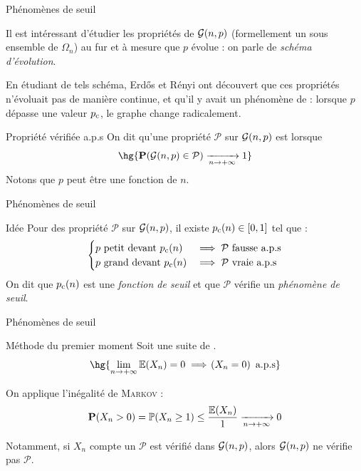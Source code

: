 \documentclass[french,bookmarks]{beamer}
\makeatletter
\newcommand{\bdE}{\mathbb{E}}
\newcommand{\bdN}{\mathbb{N}}
\newcommand{\bdP}{\mathbb{P}}
\newcommand{\bcG}{\mathcal{G}}
\newcommand{\bcP}{\mathcal{P}}
\newcommand{\bbP}{\mathbf{P}}
\renewenvironment{proof}[1][Preuve]{%
    \par\pushQED{\color{black}\qed}\normalfont%
    \topsep6\p@\@plus6\p@\relax
    \trivlist\item[\hskip\labelsep\colorbox{\nproofcolor!85!gray!20}{\color{\nproofcolor}\rmfamily\itshape#1\@addpunct{.}}]%
    \ignorespaces\rmfamily\small
}{%
  \popQED\endtrivlist\@endpefalse
}
\newenvironment{nproof}{
    \begingroup
    \begin{tcolorbox}[
        breakable,
        enhanced,
        interior style      = {
            left color      = main1white2!65!gray!8,
            middle color    = main1white2!50!gray!7,
            right color     = main1white2!35!gray!6
        },
        borderline west     = {2pt}{0pt}{\nproofcolor!85!gray!50},
        sharp corners       = downhill,
        frame hidden,
        arc                 = 0 cm,
        boxrule             = 0 cm,
        nobeforeSTYLE,
        noafterSTYLE,
    ]
        \begin{proof}\sffamily
}{
        \end{proof}
    \end{tcolorbox}
    \endgroup
}
\makeatother
\begin{document}
\begin{frame}{Phénomènes de seuil}

    \begin{enumerate}
        \itt Il est intéressant d'étudier les propriétés de $\bcG\p{n, p}$ (formellement un sous ensemble de $\Omega_n$) au fur et à mesure que $p$ évolue : on parle de \emph{schéma d'évolution}.\pause
        
        \itt En étudiant de tels schéma, Erdős et Rényi ont découvert que ces propriétés n'évoluait pas de manière continue, et qu'il y avait un phénomène de  : lorsque $p$ dépasse une valeur $p_\text c$, le graphe change radicalement.
    \end{enumerate}
    \pause
    
    \begin{bdefinition}{Propriété vérifiée a.p.s}{}
        On dit qu'une propriété $\bcP$ sur $\bcG\p{n, p}$ est  lorsque
        \[ \hg{\bbP\p{\bcG\p{n, p} \in \bcP} \lima{n \to +\infty} 1}\]
        Notons que $p$ peut être une fonction de $n$.
    \end{bdefinition}
\end{frame}

\begin{frame}{Phénomènes de seuil}
    \begin{bform}{Idée}{}
            Pour des propriété $\bcP$ sur $\bcG\p{n, p}$, il existe $p_\text c\!\left(n\right) \in \left[0, 1\right]$ tel que :
            \[ \begin{cases}
                p \ \text{petit devant} \ p_\text c\p{n} &\implies \bcP \ \text{fausse a.p.s}\\
                p \ \text{grand devant} \ p_\text c\p{n} &\implies \bcP \ \text{vraie a.p.s}
            \end{cases}\]
            \pause
            On dit que $p_\text c\!\left(n\right)$ est une \emph{fonction de seuil} et que $\bcP$ vérifie un \emph{phénomène de seuil}.
    \end{bform}
\end{frame}

\begin{frame}{Phénomènes de seuil}
    \begin{bproperty}{Méthode du premier moment}{}
        Soit \hg{$\p{X_n}_{n \in \bdN^*}$} une suite de \hg{v.a. à valeurs dans $\bdN$}.
        \[ \hg{\lim\limits_{n \to +\infty} \bdE\p{X_n} = 0 \implies \p{X_n = 0} \ \text{a.p.s}} \]
    \end{bproperty}
    \pause
    \begin{nproof}
        On applique l'inégalité de \textsc{Markov} :
        \[ \bbP\p{X_n > 0} = \bdP\p{X_n \geq 1} \leq \dfrac{\bdE\p{X_n}}{1} \lima{n \to +\infty} 0\]
    \end{nproof}\pause
    
    Notamment, si $X_n$ compte  un $\bcP$ est vérifié dans $\bcG\p{n, p}$, alors $\bcG\p{n,p}$ ne vérifie pas $\bcP$.
\end{frame}
\end{document}
